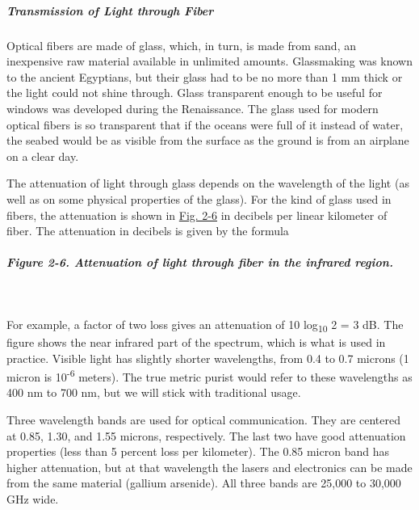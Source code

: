 \documentclass[b5paper,11pt]{memoir}
\begin{document}
\protect\hypertarget{0130661023_ch02lev1sec2.htmlux5cux23ch02lev3sec1}{}{}

\subparagraph{Transmission of Light through Fiber}

Optical fibers are made of glass, which, in turn, is made from sand, an
inexpensive raw material available in unlimited amounts. Glassmaking was
known to the ancient Egyptians, but their glass had to be no more than 1
mm thick or the light could not shine through. Glass transparent enough
to be useful for windows was developed during the Renaissance. The glass
used for modern optical fibers is so transparent that if the oceans were
full of it instead of water, the seabed would be as visible from the
surface as the ground is from an airplane on a clear day.

The attenuation of light through glass depends on the wavelength of the
light (as well as on some physical properties of the glass). For the
kind of glass used in fibers, the attenuation is shown in
\protect\hyperlink{0130661023_ch02lev1sec2.htmlux5cux23ch02fig06}{Fig.
2-6} in decibels per linear kilometer of fiber. The attenuation in
decibels is given by the formula

\subparagraph[Figure 2-6. Attenuation of light through fiber in the
infrared
region.]{\texorpdfstring{\protect\hypertarget{0130661023_ch02lev1sec2.htmlux5cux23ch02fig06}{}{}Figure
2-6. Attenuation of light through fiber in the infrared
region.}{Figure 2-6. Attenuation of light through fiber in the infrared region.}}



~

For example, a factor of two loss gives an attenuation of 10
log\textsubscript{10} 2 = 3 dB. The figure shows the near infrared part
of the spectrum, which is what is used in practice. Visible light has
slightly shorter wavelengths, from 0.4 to 0.7 microns (1 micron is
10\textsuperscript{-6} meters). The true metric purist would refer to
these wavelengths as 400 nm to 700 nm, but we will stick with
traditional usage.

Three wavelength bands are used for optical communication. They are
centered at 0.85, 1.30, and 1.55 microns, respectively. The last two
have good attenuation properties (less than 5 percent loss per
kilometer). The 0.85 micron band has higher attenuation, but at that
wavelength the lasers and electronics can be made from the same material
(gallium arsenide). All three bands are 25,000 to 30,000 GHz wide.
\end{document}
